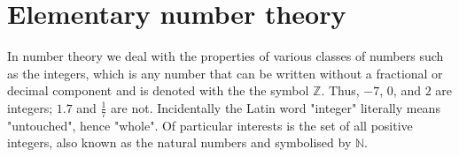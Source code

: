\chapter{Elementary number theory}



In number theory we deal with the properties of various classes of numbers such
as the integers, which is any number that can be written without a fractional
or decimal component and is denoted with the the symbol $\mathbb{Z}$. Thus,
$-7$, $0$, and $2$ are integers; $1.7$ and $\frac{1}{7}$ are not. Incidentally
the Latin word "integer" literally means "untouched", hence "whole". Of
particular interests is the set of all positive integers, also known as the
natural numbers and symbolised by $\mathbb{N}$.

